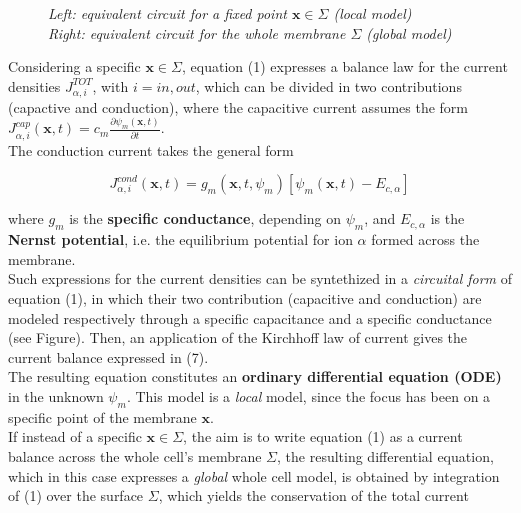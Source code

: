 \documentclass[a4paper]{article}
\begin{document}
\begin{figure}[H]
\begin{minipage}{\linewidth}
\begin{minipage}{0.48\linewidth}
\begin{figure}[H]
				\end{figure}
			\end{minipage}
			
		\end{minipage}
		\caption{\textit{Left: equivalent circuit for a fixed point $\textbf{x} \in \Sigma$ (local model)  \\
				Right: equivalent circuit for the whole membrane  $\Sigma$ (global model)}}
	\end{figure}

	
	Considering  a specific $\textbf{x} \in \Sigma$, equation (1) expresses a balance law for the current densities $J_{\alpha,i}^{TOT}$, with $ i= in,out$, which can be divided in two contributions (capactive and conduction), where the capacitive current assumes the form $J^{cap}_{\alpha,i}(\textbf{x},t) = c_m \frac{\partial \psi_m(\textbf{x},t)}{\partial t}$.\\
	The conduction current takes the general form 
	
	\begin{equation}
		J^{cond}_{\alpha,i}(\textbf{x},t) = g_m(\textbf{x},t,\psi_m) [\psi_m(\textbf{x},t) - E_{c,\alpha}]
	\end{equation}
	
	where $g_m$ is the \textbf{specific conductance}, depending on $\psi_m$, and $E_{c,\alpha}$ is the \textbf{Nernst potential}, i.e. the equilibrium potential for ion $\alpha$ formed across the membrane.\\
Such expressions for the current densities can be syntethized in a \textit{circuital form} of equation (1), in which their two contribution (capacitive and conduction) are modeled respectively through a specific capacitance and a specific conductance (see Figure). Then, an application of the Kirchhoff law of current gives the current balance expressed in (7).\\
The resulting equation constitutes an \textbf{ordinary differential equation (ODE)} in the unknown $\psi_m$. This model is a \textit{local} model, since the focus has been on a specific point of the membrane $\textbf{x}$.
\\
	If instead of a specific $\textbf{x} \in \Sigma$, the aim is to write equation (1) as a current balance across the whole cell's membrane $\Sigma$, the resulting differential equation, which in this case expresses a \textit{global} whole cell model, is obtained by integration of (1) over the surface $\Sigma$,  which yields the conservation of the total current 
	
\end{document}
